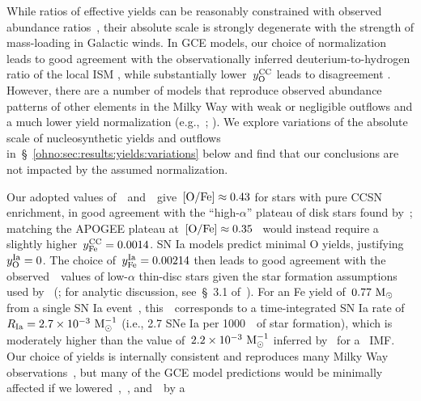 While ratios of effective yields can be reasonably constrained with observed
abundance ratios~\citep[e.g.,][]{Weinberg2019, Weinberg2022, Griffith2021b,
Griffith2022}, their absolute scale is strongly degenerate with the strength of
mass-loading in Galactic winds.
In GCE models, our choice of normalization leads to good agreement with the
observationally inferred deuterium-to-hydrogen ratio of the local ISM
\citep{Linsky2006}, while substantially lower~$y_\text{O}^\text{CC}$ leads to disagreement
\citep{Weinberg2017b}.
However, there are a number of models that reproduce observed abundance
patterns of other elements in the Milky Way with weak or negligible outflows
and a much lower yield normalization (e.g.,~\citealp*{Kubryk2015b};
\citealp{Prantzos2018, Spitoni2019, Spitoni2021}).
We explore variations of the absolute scale of nucleosynthetic yields and
outflows in~\S~\ref{ohno:sec:results:yields:variations} below and find that our
conclusions are not impacted by the assumed normalization.
\par
Our adopted values of~~and~~give~$\text{[O/Fe]}\approx0.43$ for stars
with pure CCSN enrichment, in good agreement with the ``high-$\alpha$'' plateau
of disk stars found by~\citet{Ramirez2013}; matching the APOGEE plateau
at~$\text{[O/Fe]}\approx0.35$~\citep[see, e.g., fig.~6 of][]{Hasselquist2021} would
instead require a slightly higher~$y_\text{Fe}^\text{CC} = 0.0014$.
SN Ia models predict minimal O yields, justifying~$y_\text{O}^\text{Ia} = 0$.
The choice of~$y_\text{Fe}^\text{Ia} = 0.00214$ then leads to good agreement with the
observed~\ofe~values of low-$\alpha$ thin-disc stars given the star formation
assumptions used by~\citeauthor{Johnson2021} (\citeyear{Johnson2021}; for
analytic discussion, see~\S~3.1 of~\citealp{Weinberg2017b}).
For an Fe yield of~$0.77~\text{M}_\odot$ from a single SN Ia event~\citep{Iwamoto1999},
this~~corresponds to a time-integrated SN Ia rate
of~$R_\text{Ia} = 2.7\times10^{-3}~\text{M}_\odot^{-1}$ (i.e., 2.7 SNe Ia per
1000~\msun~of star formation), which is moderately higher than the value
of~$2.2\times10^{-3}~\text{M}_\odot^{-1}$ inferred by~\citet{Maoz2012a} for
a~\citet{Kroupa2001} IMF.
Our choice of yields is internally consistent and reproduces many Milky Way
observations~\citep{Johnson2021}, but many of the GCE model predictions would
be minimally affected if we lowered~,~, and~~by a
